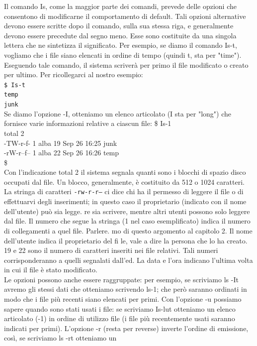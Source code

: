 Il comando Is, come la maggior parte dei comandi, prevede delle opzioni che consentono
 di modificarne il comportamento di default. Tali opzioni alternative devono
essere scritte dopo il comando, sulla sua stessa riga, e generalmente devono essere
precedute dal segno meno. Esse sono costituite da una singola lettera che ne sintetizza
il significato. Per esempio, se diamo il comando Is-t, vogliamo che i file siano elencati
in ordine di tempo (quindi t, sta per "time"). Eseguendo tale comando, il sistema
scriverà per primo il file modificato o creato per ultimo.
Per ricollegarci al nostro esempio:\\
{\tt\$ Is-t}\\
{\tt temp}\\
{\tt junk}\\
Se diamo l'opzione -I, otteniamo un elenco articolato (I sta per "long") che fornisce
varie informazioni relative a ciascun file:
\$ Is-1\\
total 2\\
-TW-r-f- 1 alba 19 Sep 26 16:25 junk\\
-rW-r--f-- 1 alba 22 Sep 26 16:26 temp\\
\$\\
Con l'indicazione total 2 il sistema segnala quanti sono i blocchi di spazio disco occupati
 dal file. Un blocco, generalmente, è costituito da 512 o 1024 caratteri. La stringa
di caratteri {\tt -rw-r-r--} ci dice chi ha il permesso di leggere il file o di effettuarvi degli
 inserimenti; in questo caso il proprietario (indicato con il nome dell'utente) può sia legge.
re sia scrivere, mentre altri utenti possono solo leggere dal file. Il numero che segue la
stringa (1 nel caso esemplificato) indica il numero di collegamenti a quel file. Parlere.
mo di questo argomento al capitolo 2. Il nome dell'utente indica il proprietario del fi
le, vale a dire la persona che lo ha creato. 19 e 22 sono il numero di caratteri inseriti
nei file relativi. Tali numeri corrisponderanno a quelli segnalati dall'ed. La data e
l'ora indicano l'ultima volta in cui il file è stato modificato.\\
Le opzioni possono anche essere raggruppate: per esempio, se scriviamo ls -It avremo
 gli stessi dati che otteniamo scrivendo ls-1; che però saranno ordinati in modo che
i file più recenti siano elencati per primi. Con l'opzione -u possiamo sapere quando
sono stati usati i file: se scriviamo Is-lut otteniamo un elenco articolato (-1) in ordine
di utilizzo file (i file più recentemente usati saranno indicati per primi). L'opzione -r
(resta per reverse) inverte l'ordine di emissione, così, se scriviamo ls -rt otteniamo un

